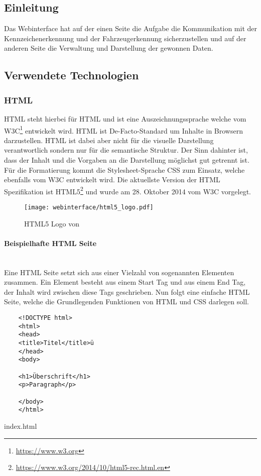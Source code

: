 \def \sectionauthors {Philipp Kraft}

\subsection{Einleitung}
Das Webinterface hat auf der einen Seite die Aufgabe die Kommunikation mit der
Kennzeichenerkennung und der Fahrzeugerkennung sicherzustellen und auf der
anderen Seite die Verwaltung und Darstellung der gewonnen Daten.

\subsection{Verwendete Technologien}
\subsubsection{HTML}
\acs*{HTML} steht hierbei für \acl*{HTML} und ist eine Auszeichnungssprache
welche vom \ac*{W3C}\footnote{\url{https://www.w3.org} } entwickelt wird.
\ac*{HTML} ist De-Facto-Standard um Inhalte in Browsern darzustellen.
\acs*{HTML} ist dabei aber nicht für die visuelle Darstellung verantwortlich
sondern nur für die semantische Struktur. Der Sinn dahinter ist, dass der Inhalt
und die Vorgaben an die Darstellung möglichst gut getrennt ist. Für die
Formatierung kommt die Stylesheet-Sprache \ac*{CSS} zum Einsatz, welche
ebenfalls vom \acl*{W3C} entwickelt wird. Die aktuellste Version der \acs*{HTML}
Spezifikation ist
HTML5\footnote{\url{https://www.w3.org/2014/10/html5-rec.html.en}} und wurde am
28. Oktober 2014 vom \acs*{W3C} vorgelegt.

\begin{figure}[H]
  \centering
  \texttt{[image: webinterface/html5\_logo.pdf]}
  \caption{HTML5 Logo von }
\end{figure}

\paragraph{Beispielhafte HTML Seite}\mbox{}\\
Eine \acs*{HTML} Seite setzt sich aus einer Vielzahl von sogenannten Elementen
zusammen. Ein Element besteht aus einem Start Tag und aus einem End Tag, der
Inhalt wird zwischen diese Tags geschrieben. Nun folgt eine einfache HTML Seite,
welche die Grundlegenden Funktionen von HTML und CSS darlegen soll.

\begin{listing}[H]
  \begin{verbatim}
    <!DOCTYPE html>
    <html>
    <head>
    <title>Titel</title>ü
    </head>
    <body>

    <h1>Überschrift</h1>
    <p>Paragraph</p>

    </body>
    </html>
  \end{verbatim}
  \caption{index.html}
  \label{lst:simple_html_site}
\end{listing}

